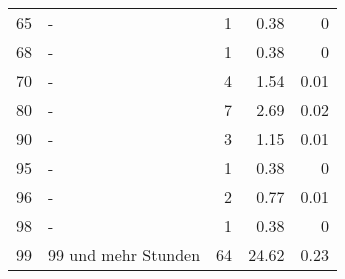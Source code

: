 \begin{longtable}{lXrrr}
        65 & \multicolumn{1}{X}{-} & %
          \num{1} &
          \num[round-mode=places,round-precision=2]{0,38} &
          \num[round-mode=places,round-precision=2]{0} \\

        68 & \multicolumn{1}{X}{-} & %
          \num{1} &
          \num[round-mode=places,round-precision=2]{0,38} &
          \num[round-mode=places,round-precision=2]{0} \\

        70 & \multicolumn{1}{X}{-} & %
          \num{4} &
          \num[round-mode=places,round-precision=2]{1,54} &
          \num[round-mode=places,round-precision=2]{0,01} \\

        80 & \multicolumn{1}{X}{-} & %
          \num{7} &
          \num[round-mode=places,round-precision=2]{2,69} &
          \num[round-mode=places,round-precision=2]{0,02} \\

        90 & \multicolumn{1}{X}{-} & %
          \num{3} &
          \num[round-mode=places,round-precision=2]{1,15} &
          \num[round-mode=places,round-precision=2]{0,01} \\

        95 & \multicolumn{1}{X}{-} & %
          \num{1} &
          \num[round-mode=places,round-precision=2]{0,38} &
          \num[round-mode=places,round-precision=2]{0} \\

        96 & \multicolumn{1}{X}{-} & %
          \num{2} &
          \num[round-mode=places,round-precision=2]{0,77} &
          \num[round-mode=places,round-precision=2]{0,01} \\

        98 & \multicolumn{1}{X}{-} & %
          \num{1} &
          \num[round-mode=places,round-precision=2]{0,38} &
          \num[round-mode=places,round-precision=2]{0} \\

        99 & \multicolumn{1}{X}{99 und mehr Stunden} & %
          \num{64} &
          \num[round-mode=places,round-precision=2]{24,62} &
          \num[round-mode=places,round-precision=2]{0,23} \\


\end{longtable}
